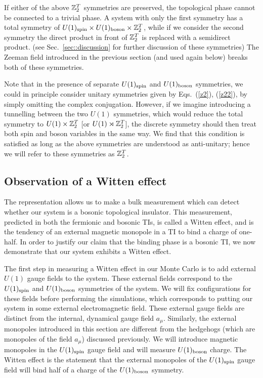 If either of the above $\mathbb{Z}_2^T$ symmetries are preserved, the topological phase cannot be connected to a trivial phase. A system with only the first symmetry has a total symmetry of $U(1)_{\rm spin}\times U(1)_{\rm boson}\times \mathbb{Z}_2^T$, while if we consider the second symmetry the direct product in front of $\mathbb{Z}_2^T$ is replaced with a semidirect product. (see Sec.~\ref{sec::discussion} for further discussion of these symmetries) The Zeeman field introduced in the previous section (and used again below) breaks both of these symmetries.

Note that in the presence of separate $U(1)_{\rm spin}$ and $U(1)_{\rm boson}$ symmetries, we could in principle consider unitary symmetries given by Eqs.~(\ref{z2}), (\ref{z22}), by simply omitting the complex conjugation.  However, if we imagine introducing a tunnelling between the two $U(1)$ symmetries, which would reduce the total symmetry to $U(1)\times\mathbb{Z}_2^T$ [or $U(1)\rtimes\mathbb{Z}_2^T$], the discrete symmetry should then treat both spin and boson variables in the same way. We find that this condition is satisfied as long as the above symmetries are understood as anti-unitary; hence we will refer to these symmetries as $\mathbb{Z}_2^T$.


\subsection{Observation of a Witten effect}
\label{subsec::witten}
The \cp representation allows us to make a bulk measurement which can detect whether our system is a bosonic topological insulator. This measurement, predicted in both the fermionic\cite{FranzWitten} and bosonic\cite{MaxWitten, Max, YeWen2014, YeWang2014} TIs, is called a Witten effect, and is the tendency of an external magnetic monopole in a TI to bind a charge of one-half. 
In order to justify our claim that the binding phase is a bosonic TI, we now demonstrate that our system exhibits a Witten effect. 

The first step in measuring a Witten effect in our Monte Carlo is to add external $U(1)$ gauge fields to the system. These external fields correspond to the $U(1)_{\rm spin}$ and $U(1)_{\rm boson}$ symmetries of the system. We will fix configurations for these fields before performing the simulations, which corresponds to putting our system in some external electromagnetic field. These external gauge fields are distinct from the internal, dynamical gauge field $a_\mu$. Similarly, the external monopoles introduced in this section are different from the hedgehogs (which are monopoles of the field $a_\mu$) discussed previously. We will introduce magnetic monopoles in the $U(1)_{\rm spin}$ gauge field and will measure $U(1)_{\rm boson}$ charge. The Witten effect is the statement that the external monopoles of the $U(1)_{\rm spin}$ gauge field will bind half of a charge of the $U(1)_{\rm boson}$ symmetry.

